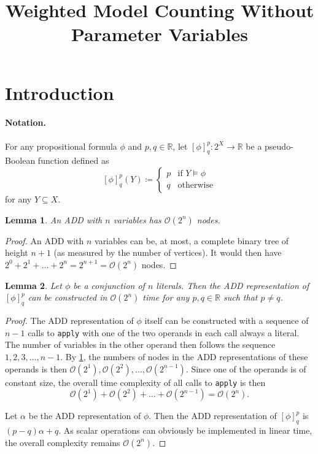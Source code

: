 \documentclass{article}
\title{Weighted Model Counting Without Parameter Variables}
\newtheorem{lemma}{Lemma}
\theoremstyle{definition}
\theoremstyle{remark}
\begin{document}
\maketitle

\section{Introduction}

\paragraph{Notation.} For any propositional formula $\phi$ and $p, q \in
\mathbb{R}$, let $[\phi]^p_q\colon 2^X \to \mathbb{R}$ be a
pseudo-Boolean function defined as
\[
  [\phi]^p_q(Y) \coloneqq
  \begin{cases}
    p & \text{if } Y \models \phi \\
    q & \text{otherwise}
  \end{cases}
\]
for any $Y \subseteq X$.

\begin{lemma} \label{lemma:add_size}
  An ADD with $n$ variables has $\mathcal{O}(2^n)$ nodes.
\end{lemma}
\begin{proof}
  An ADD with $n$ variables can be, at most, a complete binary tree of height
  $n+1$ (as measured by the number of vertices). It would then have $2^0 + 2^1 +
  \dots + 2^n = 2^{n+1} = \mathcal{O}(2^n)$ nodes.
\end{proof}

\begin{lemma} \label{lemma:clause_time}
  Let $\phi$ be a conjunction of $n$ literals. Then the ADD representation of
  $[\phi]^p_q$ can be constructed in $\mathcal{O}(2^n)$ time for any $p, q \in
  \mathbb{R}$ such that $p \ne q$.
\end{lemma}
\begin{proof}
  The ADD representation of $\phi$ itself can be constructed with a sequence of
  $n-1$ calls to \texttt{apply} with one of the two operands in each call always
  a literal. The number of variables in the other operand then follows the
  sequence $1, 2, 3, \dots, n-1$. By \cref{lemma:add_size}, the numbers of nodes
  in the ADD representations of these operands is then $\mathcal{O}(2^1),
  \mathcal{O}(2^2), \dots, \mathcal{O}(2^{n-1})$. Since one of the operands is
  of constant size, the overall time complexity of all calls to \texttt{apply}
  is then
  \[
    \mathcal{O}(2^1) + \mathcal{O}(2^2) + \dots + \mathcal{O}(2^{n-1}) =
    \mathcal{O}(2^n).
  \]

  Let $\alpha$ be the ADD representation of $\phi$. Then the ADD representation
  of $[\phi]_q^p$ is $(p-q)\alpha + q$. As scalar operations can obviously be
  implemented in linear time, the overall complexity remains $\mathcal{O}(2^n)$.
\end{proof}
\end{document}
